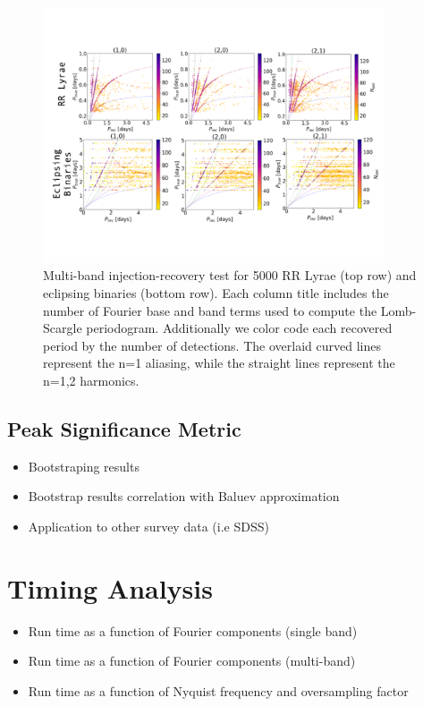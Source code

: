 \documentclass[DM,authoryear,toc]{lsstdoc}
\begin{document}
\begin{figure}
  \includegraphics[width=0.9\textwidth]{figures/multi_lsp_rectest.pdf}
  \centering 
  \caption{Multi-band injection-recovery test for 5000 RR Lyrae (top row) and eclipsing binaries (bottom row). Each column title includes the number of Fourier base and band terms used to compute the Lomb-Scargle periodogram. Additionally we color code each recovered period by the number of detections. The overlaid curved lines represent the n=1 aliasing, while the straight lines represent the n=1,2 harmonics.}
  \label{fig:comp}
\end{figure}



\subsection{Peak Significance Metric}

\begin{itemize}
\item Bootstraping results 
\item Bootstrap results correlation with Baluev approximation
\item Application to other survey data (i.e SDSS)
\end{itemize}


\section{Timing Analysis}

\begin{itemize}
\item Run time as a function of Fourier components (single band)
\item Run time as a function of Fourier components (multi-band)
\item Run time as a function of Nyquist frequency and oversampling factor
\end{itemize}
\end{document}
